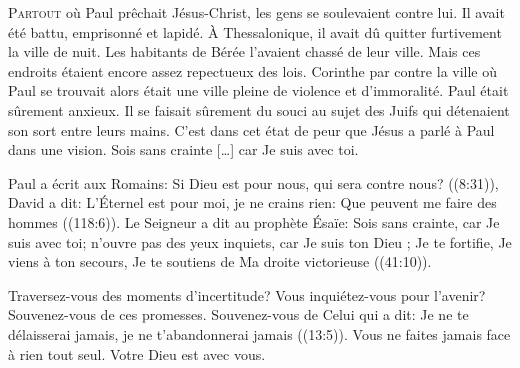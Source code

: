 


\lettrine{P}{artout} où Paul prêchait Jésus-Christ,
 les gens se soulevaient contre lui.
 Il avait été battu, emprisonné et lapidé.
 À Thessalonique, il avait dû quitter furtivement la ville de nuit.
 Les habitants de Bérée l'avaient chassé de leur ville.
 Mais ces endroits étaient encore assez repectueux des lois.
 Corinthe par contre \ocadr la ville où Paul se trouvait alors \fcadr{} était
 une ville pleine de violence et d'immoralité.
 Paul était sûrement anxieux.
 Il se faisait sûrement du souci au sujet des Juifs qui détenaient
 son sort entre leurs mains. C'est dans cet état de peur que Jésus
 a parlé à Paul dans une vision.
 \Og Sois sans crainte [\dots{}] car Je suis avec toi. \Fg{}


Paul a écrit aux Romains: 
 \Og Si Dieu est pour nous, qui sera contre nous? \Fg{} ((8:31)),
 David a dit: 
 \Og L'Éternel est pour moi, je ne crains rien:
 Que peuvent me faire des hommes \Fg{} ((118:6)).
 Le Seigneur a dit au prophète Ésaïe: 
 \Og Sois sans crainte, car Je suis avec toi; n'ouvre pas des yeux inquiets,
 car Je suis ton Dieu ; Je te fortifie, Je viens à ton secours,
 Je te soutiens de Ma droite victorieuse \Fg{} ((41:10)).

Traversez-vous des moments d'incertitude? Vous inquiétez-vous pour l'avenir?
 Souvenez-vous de ces promesses. Souvenez-vous de Celui qui a dit: 
 \Og Je ne te délaisserai jamais, je ne t'abandonnerai jamais \Fg{}
 ((13:5)).
 Vous ne faites jamais face à rien tout seul. Votre Dieu est avec vous.

\dvrule



